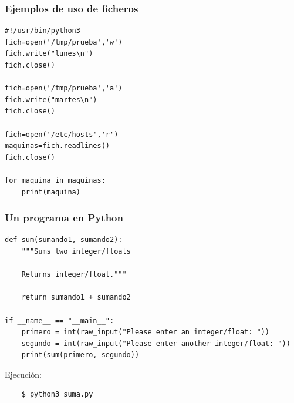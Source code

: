 \documentclass{beamer}
\begin{document}
\begin{frame}[fragile]
\frametitle{Ejemplos de uso de ficheros}

\begin{footnotesize}
\begin{verbatim}
#!/usr/bin/python3
fich=open('/tmp/prueba','w')
fich.write("lunes\n")
fich.close()

fich=open('/tmp/prueba','a')
fich.write("martes\n")
fich.close()

fich=open('/etc/hosts','r')
maquinas=fich.readlines()
fich.close()

for maquina in maquinas:
    print(maquina)

\end{verbatim}
\end{footnotesize}
\end{frame}



\begin{frame}[fragile]
\frametitle{Un programa en Python}

\begin{footnotesize}
\begin{verbatim}
def sum(sumando1, sumando2):
    """Sums two integer/floats

    Returns integer/float."""

    return sumando1 + sumando2

if __name__ == "__main__":
    primero = int(raw_input("Please enter an integer/float: "))
    segundo = int(raw_input("Please enter another integer/float: "))
    print(sum(primero, segundo))

\end{verbatim}
\end{footnotesize}

Ejecución:
\begin{footnotesize}
\begin{verbatim}
    $ python3 suma.py
\end{verbatim}
\end{footnotesize}
 
\end{frame}
\end{document}

